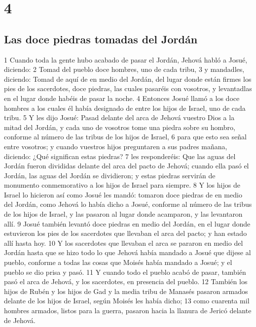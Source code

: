 \chapter{4}

\section*{Las doce piedras tomadas del Jordán}

1 Cuando toda la gente hubo acabado de pasar el Jordán, Jehová habló a Josué, diciendo:
2 Tomad del pueblo doce hombres, uno de cada tribu,
3 y mandadles, diciendo: Tomad de aquí de en medio del Jordán, del lugar donde están firmes los pies de los sacerdotes, doce piedras, las cuales pasaréis con vosotros, y levantadlas en el lugar donde habéis de pasar la noche.
4 Entonces Josué llamó a los doce hombres a los cuales él había designado de entre los hijos de Israel, uno de cada tribu.
5 Y les dijo Josué: Pasad delante del arca de Jehová vuestro Dios a la mitad del Jordán, y cada uno de vosotros tome una piedra sobre su hombro, conforme al número de las tribus de los hijos de Israel,
6 para que esto sea señal entre vosotros; y cuando vuestros hijos preguntaren a sus padres mañana, diciendo: ¿Qué significan estas piedras?
7 les responderéis: Que las aguas del Jordán fueron divididas delante del arca del pacto de Jehová; cuando ella pasó el Jordán, las aguas del Jordán se dividieron; y estas piedras servirán de monumento conmemorativo a los hijos de Israel para siempre.
8 Y los hijos de Israel lo hicieron así como Josué les mandó: tomaron doce piedras de en medio del Jordán, como Jehová lo había dicho a Josué, conforme al número de las tribus de los hijos de Israel, y las pasaron al lugar donde acamparon, y las levantaron allí.
9 Josué también levantó doce piedras en medio del Jordán, en el lugar donde estuvieron los pies de los sacerdotes que llevaban el arca del pacto; y han estado allí hasta hoy.
10 Y los sacerdotes que llevaban el arca se pararon en medio del Jordán hasta que se hizo todo lo que Jehová había mandado a Josué que dijese al pueblo, conforme a todas las cosas que Moisés había mandado a Josué; y el pueblo se dio prisa y pasó.
11 Y cuando todo el pueblo acabó de pasar, también pasó el arca de Jehová, y los sacerdotes, en presencia del pueblo.
12 También los hijos de Rubén y los hijos de Gad y la media tribu de Manasés pasaron armados delante de los hijos de Israel, según Moisés les había dicho;
13 como cuarenta mil hombres armados, listos para la guerra, pasaron hacia la llanura de Jericó delante de Jehová.

